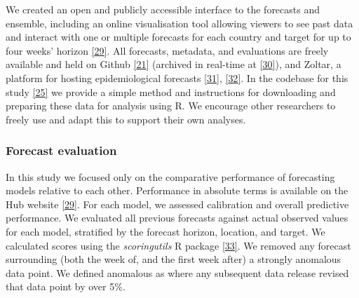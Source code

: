 \documentclass[
]{article}
\begin{document}
We created an open and publicly accessible interface to the forecasts and ensemble, including an online visualisation tool allowing viewers to see past data and interact with one or multiple forecasts for each country and target for up to four weeks' horizon \protect\hyperlink{ref-europeancovid-19forecasthubEuropeanCovid19Forecast}{{[}29{]}}. All forecasts, metadata, and evaluations are freely available and held on Github \protect\hyperlink{ref-europeancovid-19forecasthubEuropeanCOVID19Forecast2021}{{[}21{]}} (archived in real-time at \protect\hyperlink{ref-katharine_sherratt_2022_7356267}{{[}30{]}}), and Zoltar, a platform for hosting epidemiological forecasts \protect\hyperlink{ref-epiforecastsProjectECDCEuropean2021}{{[}31{]}}, \protect\hyperlink{ref-reichZoltarForecastArchive2021}{{[}32{]}}. In the codebase for this study \protect\hyperlink{ref-PredictivePerformanceMultimodel2022}{{[}25{]}} we provide a simple method and instructions for downloading and preparing these data for analysis using R. We encourage other researchers to freely use and adapt this to support their own analyses.

\hypertarget{forecast-evaluation}{%
\subsubsection{Forecast evaluation}\label{forecast-evaluation}}

In this study we focused only on the comparative performance of forecasting models relative to each other. Performance in absolute terms is available on the Hub website \protect\hyperlink{ref-europeancovid-19forecasthubEuropeanCovid19Forecast}{{[}29{]}}. For each model, we assessed calibration and overall predictive performance. We evaluated all previous forecasts against actual observed values for each model, stratified by the forecast horizon, location, and target. We calculated scores using the \emph{scoringutils} R package \protect\hyperlink{ref-nikosibosseScoringutilsUtilitiesScoring2020}{{[}33{]}}. We removed any forecast surrounding (both the week of, and the first week after) a strongly anomalous data point. We defined anomalous as where any subsequent data release revised that data point by over 5\%.
\end{document}
